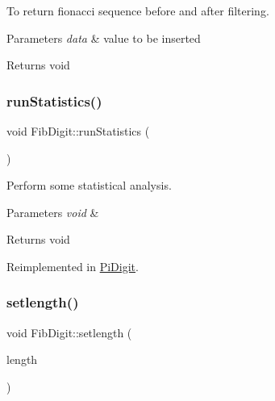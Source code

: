To return fionacci sequence before and after filtering. 


\begin{DoxyParams}{Parameters}
{\em data} & value to be inserted \\
\hline
\end{DoxyParams}
\begin{DoxyReturn}{Returns}
void 
\end{DoxyReturn}
\mbox{\label{classFibDigit_a6972af3a7b3a3ebd480655e9ea721b25}} 
\subsubsection{\texorpdfstring{run\+Statistics()}{runStatistics()}}
{\footnotesize\ttfamily void Fib\+Digit\+::run\+Statistics (\begin{DoxyParamCaption}\item[{void}]{ }\end{DoxyParamCaption})\hspace{0.3cm}{\ttfamily [virtual]}}



Perform some statistical analysis. 


\begin{DoxyParams}{Parameters}
{\em void} & \\
\hline
\end{DoxyParams}
\begin{DoxyReturn}{Returns}
void 
\end{DoxyReturn}


Reimplemented in \mbox{\hyperlink{classPiDigit_a015de54a634ef5657639269d02668927}{Pi\+Digit}}.

\mbox{\label{classFibDigit_ae57c73962682173611e86ca5938dede8}} 
\subsubsection{\texorpdfstring{setlength()}{setlength()}}
{\footnotesize\ttfamily void Fib\+Digit\+::setlength (\begin{DoxyParamCaption}\item[{unsigned int}]{length }\end{DoxyParamCaption})\hspace{0.3cm}{\ttfamily [inline]}}



